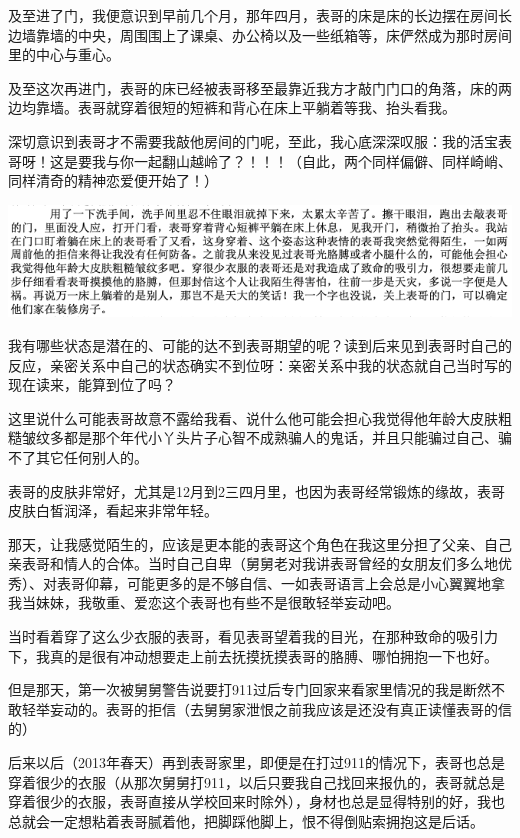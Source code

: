 \documentclass[9pt, b5paper]{article}
\begin{document}
及至进了门，我便意识到早前几个月，那年四月，表哥的床是床的长边摆在房间长边墙靠墙的中央，周围围上了课桌、办公椅以及一些纸箱等，床俨然成为那时房间里的中心与重心。

及至这次再进门，表哥的床已经被表哥移至最靠近我方才敲门门口的角落，床的两边均靠墙。表哥就穿着很短的短裤和背心在床上平躺着等我、抬头看我。

深切意识到表哥才不需要我敲他房间的门呢，至此，我心底深深叹服：我的活宝表哥呀！这是要我与你一起翻山越岭了？！！！（自此，两个同样偏僻、同样崎峭、同样清奇的精神恋爱便开始了！）

\begin{center}
\includegraphics[width=.9\linewidth]{./pic/p1p67-6.png}
\end{center}

我有哪些状态是潜在的、可能的达不到表哥期望的呢？读到后来见到表哥时自己的反应，亲密关系中自己的状态确实不到位呀：亲密关系中我的状态就自己当时写的现在读来，能算到位了吗？

这里说什么可能表哥故意不露给我看、说什么他可能会担心我觉得他年龄大皮肤粗糙皱纹多都是那个年代小丫头片子心智不成熟骗人的鬼话，并且只能骗过自己、骗不了其它任何别人的。

表哥的皮肤非常好，尤其是12月到2三四月里，也因为表哥经常锻炼的缘故，表哥皮肤白皙润泽，看起来非常年轻。

那天，让我感觉陌生的，应该是更本能的表哥这个角色在我这里分担了父亲、自己亲表哥和情人的合体。当时自己自卑（舅舅老对我讲表哥曾经的女朋友们多么地优秀）、对表哥仰幕，可能更多的是不够自信、一如表哥语言上会总是小心翼翼地拿我当妹妹，我敬重、爱恋这个表哥也有些不是很敢轻举妄动吧。

当时看着穿了这么少衣服的表哥，看见表哥望着我的目光，在那种致命的吸引力下，我真的是很有冲动想要走上前去抚摸抚摸表哥的胳膊、哪怕拥抱一下也好。

但是那天，第一次被舅舅警告说要打911过后专门回家来看家里情况的我是断然不敢轻举妄动的。表哥的拒信（去舅舅家泄恨之前我应该是还没有真正读懂表哥的信的）

后来以后（2013年春天）再到表哥家里，即便是在打过911的情况下，表哥也总是穿着很少的衣服（从那次舅舅打911，以后只要我自己找回来报仇的，表哥就总是穿着很少的衣服，表哥直接从学校回来时除外），身材也总是显得特别的好，我也总就会一定想粘着表哥腻着他，把脚踩他脚上，恨不得倒贴索拥抱这是后话。 
\end{document}
